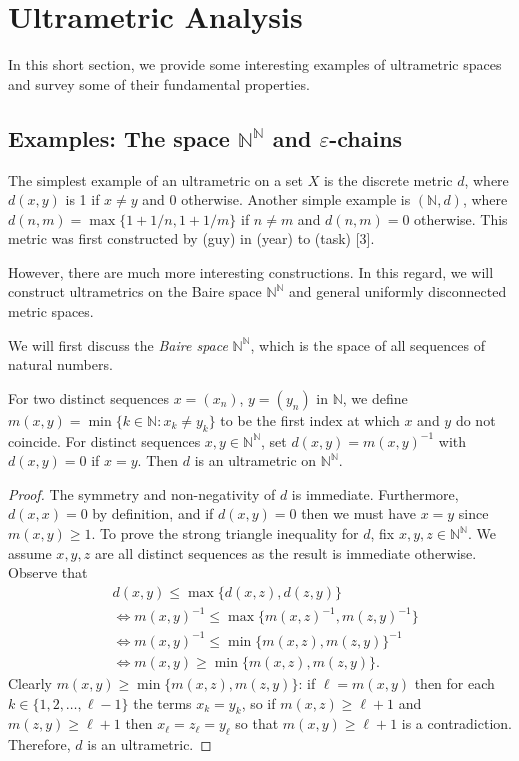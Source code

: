 \section{Ultrametric Analysis}
In this short section, we provide some interesting examples of ultrametric spaces and survey some of their fundamental properties.
\subsection{Examples: The space \( \mathbb{N} ^{\mathbb{N} } \) and \( \varepsilon  \)-chains} The simplest example of an ultrametric on a set $X$ is the discrete metric $d$, where $d(x,y)$ is 1 if $x \neq y$ and 0 otherwise. Another simple example is $(\mathbb{N}, d)$, where \( d(n,m) = \max \{ 1 + 1/n , 1 + 1/m \}  \) if \( n \neq m \) and \( d(n, m) = 0 \) otherwise. This metric was first constructed by (guy) in (year) to (task) [3]. 

However, there are much more interesting constructions. In this regard, we will construct ultrametrics on the Baire space $\mathbb{N} ^{\mathbb{N} }$ and general uniformly disconnected metric spaces.

We will first discuss the \emph{Baire space} \( \mathbb{N} ^{\mathbb{N} }  \), which is the space of all sequences of natural numbers.

For two distinct sequences \( x =  (x_{n}) \), \( y = (y_{n} ) \) in \( \mathbb{N}  \), we define \( m(x,y) = \min \{ k \in \mathbb{N} : x_{k} \neq y_{k}  \}  \) to be the first index at which \( x \) and \( y \) do not coincide. For distinct sequences \( x,y \in \mathbb{N} ^{\mathbb{N} }  \), set \( d(x,y) = m(x,y)^{-1}  \) with \( d(x,y) = 0 \) if \( x=y \). Then \( d \) is an ultrametric on \( \mathbb{N} ^{\mathbb{N} }  \).
\begin{proof}
The symmetry and non-negativity of \( d \) is immediate. Furthermore, \( d(x,x) = 0 \) by definition, and if \( d(x,y) = 0  \) then we must have \( x = y \) since \( m(x,y) \geq 1 \). To prove the strong triangle inequality for \( d \), fix \( x,y,z \in \mathbb{N} ^{\mathbb{N} }  \). We assume \( x,y,z \) are all distinct sequences as the result is immediate otherwise. Observe that
\begin{align*}
	&d(x,y) \leq \max \{ d(x,z), d(z,y) \} \\
	&\Leftrightarrow m(x,y)^{-1} \leq \max \{ m(x,z)^{-1} , m(z,y)^{-1}  \}  \\
	&\Leftrightarrow m(x,y)^{-1}  \leq \min \{ m(x,z), m(z,y) \} ^{-1} \\
	&\Leftrightarrow m(x,y) \geq \min \{ m(x,z), m(z,y) \}.
\end{align*}
Clearly \( m(x,y) \geq \min \{ m(x,z), m(z,y) \}  \): if \( \ell = m(x,y) \) then for each \( k \in \{ 1, 2, \hdots , \ell - 1 \} \) the terms \( x_{k} = y_{k}  \), so if \( m(x,z) \geq \ell + 1 \) and \( m(z,y) \geq \ell + 1 \) then \( x_{\ell} = z_{\ell} = y_{\ell}   \) so that \( m(x,y) \geq \ell + 1 \) is a contradiction. Therefore, \( d \) is an ultrametric.
\end{proof}

